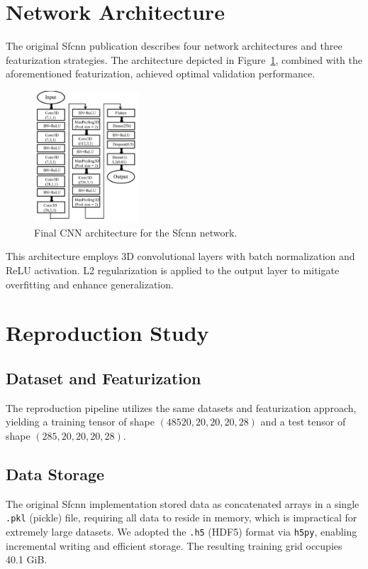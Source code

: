 \documentclass[unnumsec,webpdf,contemporary,large]{oup-authoring-template}
\theoremstyle{thmstyleone}%
\theoremstyle{thmstyletwo}%
\theoremstyle{thmstylethree}%
\begin{document}
\section{Network Architecture}

The original Sfcnn publication describes four network architectures and three featurization strategies. The architecture depicted in Figure~\ref{fig:CNN}, combined with the aforementioned featurization, achieved optimal validation performance.

\begin{figure}[H]
    \centering
    \includegraphics[width=0.35\textwidth]{images/CNN.png}
    \caption{Final CNN architecture for the Sfcnn network.}
    \label{fig:CNN}
\end{figure}

This architecture employs 3D convolutional layers with batch normalization and ReLU activation. L2 regularization is applied to the output layer to mitigate overfitting and enhance generalization.

\section{Reproduction Study}

\subsection{Dataset and Featurization}
\vspace{0.5em}
The reproduction pipeline utilizes the same datasets and featurization approach, yielding a training tensor of shape $(48520, 20, 20, 20, 28)$ and a test tensor of shape $(285, 20, 20, 20, 28)$.

\subsection{Data Storage}
\vspace{0.5em}
The original Sfcnn implementation stored data as concatenated arrays in a single \texttt{.pkl} (pickle) file, requiring all data to reside in memory, which is impractical for extremely large datasets. We adopted the \texttt{.h5} (HDF5) format via \texttt{h5py}, enabling incremental writing and efficient storage. The resulting training grid occupies 40.1 GiB.
\end{document}

